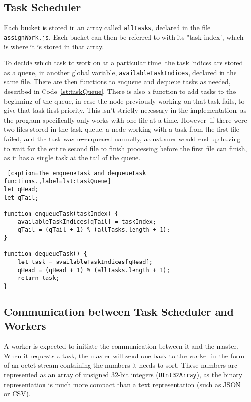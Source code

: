 \subsection{Task Scheduler} \label{sss:taskQueue}
Each bucket is stored in an array called \lstinline{allTasks}, declared in the file \lstinline{assignWork.js}. Each bucket can then be referred to with its "task index", which is where it is stored in that array.

To decide which task to work on at a particular time, the task indices are stored as a queue, in another global variable, \lstinline{availableTaskIndices}, declared in the same file. There are then functions to enqueue and dequeue tasks as needed, described in Code \ref{lst:taskQueue}. There is also a function to add tasks to the beginning of the queue, in case the node previously working on that task fails, to give that task first priority. This isn't strictly necessary in the implementation, as the program specifically only works with one file at a time. However, if there were two files stored in the task queue, a node working with a task from the first file failed, and the task was re-enqueued normally, a customer would end up having to wait for the entire second file to finish processing before the first file can finish, as it has a single task at the tail of the queue. 

\begin{lstlisting} [caption=The enqueueTask and dequeueTask functions.,label=lst:taskQueue]
let qHead;
let qTail;

function enqueueTask(taskIndex) {
    availableTaskIndices[qTail] = taskIndex;
    qTail = (qTail + 1) % (allTasks.length + 1);
}

function dequeueTask() {
    let task = availableTaskIndices[qHead];
    qHead = (qHead + 1) % (allTasks.length + 1);
    return task;
}
\end{lstlisting}


\subsection{Communication between Task Scheduler and Workers}
A worker is expected to initiate the communication between it and the master. When it requests a task, the master will send one back to the worker in the form of an octet stream containing the numbers it needs to sort. These numbers are represented as an array of unsigned 32-bit integers (\lstinline{UInt32Array}), as the binary representation is much more compact than a text representation (such as JSON or CSV).

